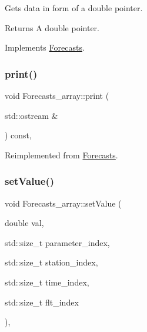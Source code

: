Gets data in form of a double pointer. \begin{DoxyReturn}{Returns}
A double pointer. 
\end{DoxyReturn}


Implements \mbox{\hyperlink{class_forecasts_a329d00c8a677da77c514908182fda0b6}{Forecasts}}.

\mbox{\label{class_forecasts__array_a56985347f516340034b29dc4cdda87b1}} 
\subsubsection{\texorpdfstring{print()}{print()}}
{\footnotesize\ttfamily void Forecasts\+\_\+array\+::print (\begin{DoxyParamCaption}\item[{std\+::ostream \&}]{ }\end{DoxyParamCaption}) const\hspace{0.3cm}{\ttfamily [override]}, {\ttfamily [virtual]}}



Reimplemented from \mbox{\hyperlink{class_forecasts_addb1f75f0dc6833c466453c51256812c}{Forecasts}}.

\mbox{\label{class_forecasts__array_a19d59c93e8b7692ebae2d3e15dc43f87}} 
\subsubsection{\texorpdfstring{set\+Value()}{setValue()}\hspace{0.1cm}{\footnotesize\ttfamily [1/2]}}
{\footnotesize\ttfamily void Forecasts\+\_\+array\+::set\+Value (\begin{DoxyParamCaption}\item[{double}]{val,  }\item[{std\+::size\+\_\+t}]{parameter\+\_\+index,  }\item[{std\+::size\+\_\+t}]{station\+\_\+index,  }\item[{std\+::size\+\_\+t}]{time\+\_\+index,  }\item[{std\+::size\+\_\+t}]{flt\+\_\+index }\end{DoxyParamCaption})\hspace{0.3cm}{\ttfamily [override]}, {\ttfamily [virtual]}}



